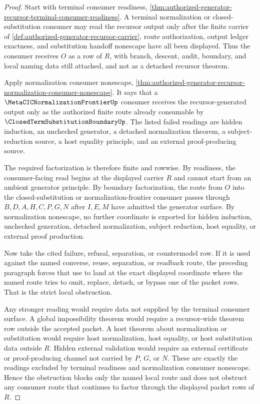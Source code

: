\begin{proof}
Start with terminal consumer readiness, \autoref{thm:authorized-generator-recursor-terminal-consumer-readiness}. A terminal normalization or closed-substitution consumer may read the recursor output only after the finite carrier of \autoref{def:authorized-generator-recursor-carrier}, route authorization, output ledger exactness, and substitution handoff nonescape have all been displayed. Thus the consumer receives $O$ as a row of $R$, with branch, descent, audit, boundary, and local naming data still attached, and not as a detached recursor theorem.

Apply normalization consumer nonescape, \autoref{thm:authorized-generator-recursor-normalization-consumer-nonescape}. It says that a $\MetaCICNormalizationFrontierUp$ consumer receives the recursor-generated output only as the authorized finite route already consumable by $\ClosedTermSubstitutionBoundaryUp$. The listed failed readings are hidden induction, an unchecked generator, a detached normalization theorem, a subject-reduction source, a host equality principle, and an external proof-producing source.

The required factorization is therefore finite and rowwise. By readiness, the consumer-facing read begins at the displayed carrier $R$ and cannot start from an ambient generator principle. By boundary factorization, the route from $O$ into the closed-substitution or normalization-frontier consumer passes through $B,D,A,H,C,P,G,N$ after $I,E,M$ have admitted the generator surface. By normalization nonescape, no further coordinate is exported for hidden induction, unchecked generation, detached normalization, subject reduction, host equality, or external proof production.

Now take the cited failure, refusal, separation, or countermodel row. If it is used against the named converse, reuse, separation, or readback route, the preceding paragraph forces that use to land at the exact displayed coordinate where the named route tries to omit, replace, detach, or bypass one of the packet rows. That is the strict local obstruction.

Any stronger reading would require data not supplied by the terminal consumer surface. A global impossibility theorem would require a recursor-wide theorem row outside the accepted packet. A host theorem about normalization or substitution would require host normalization, host equality, or host substitution data outside $R$. Hidden external validation would require an external certificate or proof-producing channel not carried by $P$, $G$, or $N$. These are exactly the readings excluded by terminal readiness and normalization consumer nonescape. Hence the obstruction blocks only the named local route and does not obstruct any consumer route that continues to factor through the displayed packet rows of $R$.
\end{proof}

